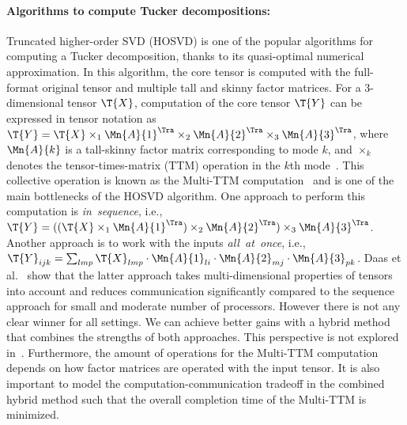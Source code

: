 \documentclass[a4paper,11pt]{article}
\newcommand{\X}{\T{X}}
\newcommand{\Y}{\T{Y}}
\newcommand{\bora}[1]{{\color{magenta} \emph{#1}}}
\begin{document}
	\vspace*{-0.25cm}\paragraph{Algorithms to compute Tucker decompositions:}
	Truncated higher-order SVD (HOSVD) is one of the popular algorithms for computing a Tucker decomposition, thanks to its quasi-optimal numerical approximation. In this algorithm, the core tensor is computed with the full-format original tensor and multiple tall and skinny factor matrices. For a 3-dimensional tensor $\X$, computation of the core tensor $\Y$ can be expressed in tensor notation as $\Y = \X \times_1 {\Mn{A}{1}}^\Tra \times_2 {\Mn{A}{2}}^\Tra \times_3 {\Mn{A}{3}}^\Tra$, where 
	$\Mn{A}{k}$ is a tall-skinny factor matrix corresponding to mode $k$, and $\times_k$ denotes the tensor-times-matrix (TTM) operation in the $k$th mode~\cite{KB-SIAM-2009}. This collective operation is known as the Multi-TTM computation~\cite{ABGKR-SIMAX-2022} and is one of the main bottlenecks of the HOSVD algorithm. One approach to perform this computation is \emph{in~sequence}, i.e., $\Y = ((\X \times_1 {\Mn{A}{1}}^\Tra )\times_2 {\Mn{A}{2}}^\Tra) \times_3 {\Mn{A}{3}}^\Tra$. Another approach is to work with the inputs \emph{all~at~once}, i.e., $\Y_{ijk} = \sum_{lmp}\X_{lmp}\cdot\Mn{A}{1}_{li}\cdot \Mn{A}{2}_{mj}\cdot \Mn{A}{3}_{pk}$.
	Daas et al.~\cite{ABGKR-SIMAX-2022} show that the latter approach takes multi-dimensional properties of tensors into account and reduces communication significantly compared to the sequence approach for small and moderate number of processors. However there is not any clear winner for all settings. We can achieve better gains with a hybrid method that combines the strengths of both approaches. This perspective is not explored in~\cite{ABGKR-SIMAX-2022}.
	Furthermore, the amount of operations for the Multi-TTM computation depends on how factor matrices are operated with the input tensor. It is also important to model the computation-communication tradeoff in the combined hybrid method such that the overall completion time of the Multi-TTM is minimized.
	
	
\end{document}
